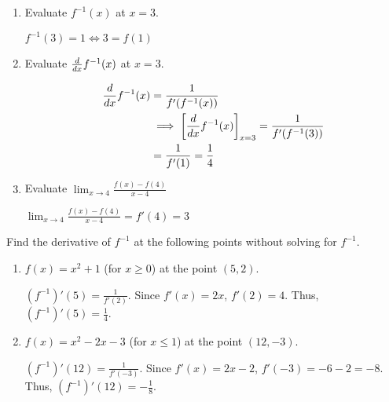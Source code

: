 \documentclass[nooutcomes]{ximera}
\begin{document}
\begin{problem}
\begin{enumerate}
    \item Evaluate $f^{-1}(x)$ at $x = 3$.
      \begin{freeResponse}
	$ f^{-1}(3) = 1 \iff 3 = f(1)$
      \end{freeResponse}


    \item Evaluate $\frac{d}{dx} f^{-1}(x)$ at $x = 3$.
      \begin{freeResponse}
        \begin{align*}
          \frac{d}{dx} f^{-1}(x) &= \frac{1}{f'(f^{-1}(x))} \\
          &\implies \bigg[ \frac{d}{dx} f^{-1}(x) \bigg]_{x = 3} = \frac{1}{f'(f^{-1}(3))} \\
          &= \frac{1}{f'(1)} = \frac{1}{4}
        \end{align*}
      \end{freeResponse}
      
      \item Evaluate $\lim_{x \to 4} \frac{f(x)-f(4)}{x-4}$
      \begin{freeResponse}
$\lim_{x \to 4} \frac{f(x)-f(4)}{x-4} = f'(4)=3$
      \end{freeResponse}
  \end{enumerate}
\end{problem}


\begin{problem}
Find the derivative of $f^{-1}$ at the following points without solving for $f^{-1}$.
	\begin{enumerate}
	
	\item  $f(x) = x^2 + 1$ (for $x \geq 0$) at the point $(5,2)$.  
		\begin{freeResponse}
		$(f^{-1})'(5) = \frac{1}{f'(2)}$.  Since $f'(x) = 2x$, $f'(2) = 4$.  Thus, $(f^{-1})'(5) = \frac{1}{4}$.  
		\end{freeResponse}

	\item  $f(x) = x^2 - 2x - 3$ (for $x \leq 1$) at the point $(12, -3)$.  
		\begin{freeResponse}
		$(f^{-1})'(12) = \frac{1}{f'(-3)}$.  Since $f'(x) = 2x - 2$, $f'(-3) = -6 - 2 = -8$.  Thus, $(f^{-1})'(12) = - \frac{1}{8}$. 
		\end{freeResponse}
	\end{enumerate}
\end{problem}
\end{document}

